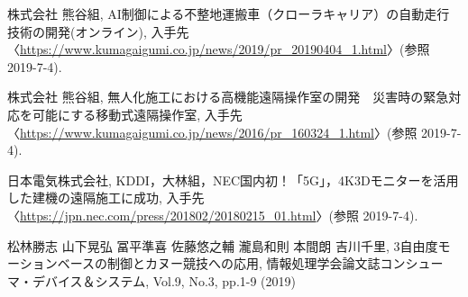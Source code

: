 \documentclass[10pt,a4paper]{jsarticle}
\begin{document}
\begin{flushleft} %
\begin{thebibliography}{9} %

株式会社 熊谷組, AI制御による不整地運搬車（クローラキャリア）の自動走行技術の開発(オンライン), 入手先〈\url{https://www.kumagaigumi.co.jp/news/2019/pr_20190404_1.html}〉(参照 2019-7-4).

株式会社 熊谷組, 無人化施工における高機能遠隔操作室の開発　災害時の緊急対応を可能にする移動式遠隔操作室, 入手先〈\url{https://www.kumagaigumi.co.jp/news/2016/pr_160324_1.html}〉(参照 2019-7-4).

日本電気株式会社, KDDI，大林組，NEC国内初！「5G」，4K3Dモニターを活用した建機の遠隔施工に成功, 入手先〈\url{https://jpn.nec.com/press/201802/20180215_01.html}〉(参照 2019-7-4).

松林勝志 山下晃弘 冨平準喜 佐藤悠之輔 瀧島和則 本間朗 吉川千里, 3自由度モーションベースの制御とカヌー競技への応用, 情報処理学会論文誌コンシューマ・デバイス＆システム, Vol.9, No.3, pp.1-9 (2019)

\end{thebibliography}
\end{flushleft}
\end{document}
